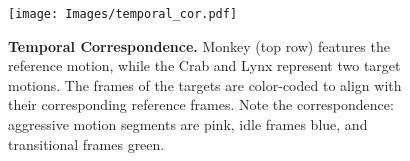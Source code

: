 \begin{figure}
    

    \centering
    
    \texttt{[image: Images/temporal\_cor.pdf]}
    
    \caption{
    \textbf{Temporal Correspondence.} Monkey (top row) features the reference motion, while the Crab and Lynx represent two target motions. The frames of the targets are color-coded to align with their corresponding reference frames.
    Note the correspondence: aggressive motion segments are pink, idle frames blue, and transitional frames green.
    }
    \label{fig:temoral_cor}
    \Description[]{}  %
\end{figure}
